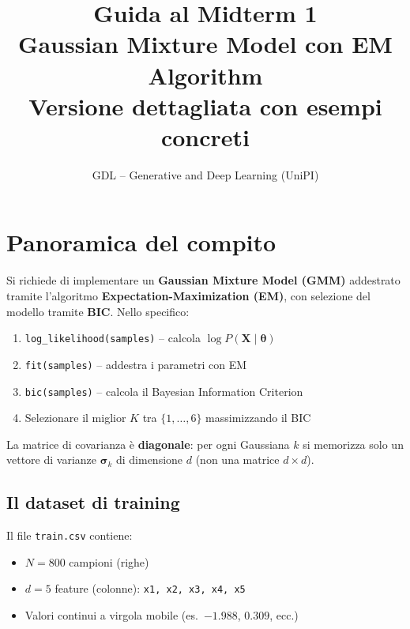 \documentclass[11pt,a4paper]{article}
\title{\textbf{Guida al Midterm 1}\\[0.3em]\large Gaussian Mixture Model con EM Algorithm\\[0.2em]\normalsize Versione dettagliata con esempi concreti}
\author{GDL -- Generative and Deep Learning (UniPI)}
\date{}
\begin{document}
\maketitle
\tableofcontents
\newpage

\section{Panoramica del compito}

Si richiede di implementare un \textbf{Gaussian Mixture Model (GMM)} addestrato tramite l'algoritmo \textbf{Expectation-Maximization (EM)}, con selezione del modello tramite \textbf{BIC}. Nello specifico:

\begin{enumerate}
    \item \texttt{log\_likelihood(samples)} -- calcola $\log P(\mathbf{X}\mid\boldsymbol{\theta})$
    \item \texttt{fit(samples)} -- addestra i parametri con EM
    \item \texttt{bic(samples)} -- calcola il Bayesian Information Criterion
    \item Selezionare il miglior $K$ tra $\{1,\ldots,6\}$ massimizzando il BIC
\end{enumerate}

\begin{warnbox}
La matrice di covarianza \`e \textbf{diagonale}: per ogni Gaussiana $k$ si memorizza solo un vettore di varianze $\boldsymbol{\sigma}_k$ di dimensione $d$ (non una matrice $d \times d$).
\end{warnbox}

\subsection{Il dataset di training}

Il file \texttt{train.csv} contiene:
\begin{itemize}
    \item $N = 800$ campioni (righe)
    \item $d = 5$ feature (colonne): \texttt{x1, x2, x3, x4, x5}
    \item Valori continui a virgola mobile (es.\ $-1.988$, $0.309$, ecc.)
\end{itemize}
\end{document}
